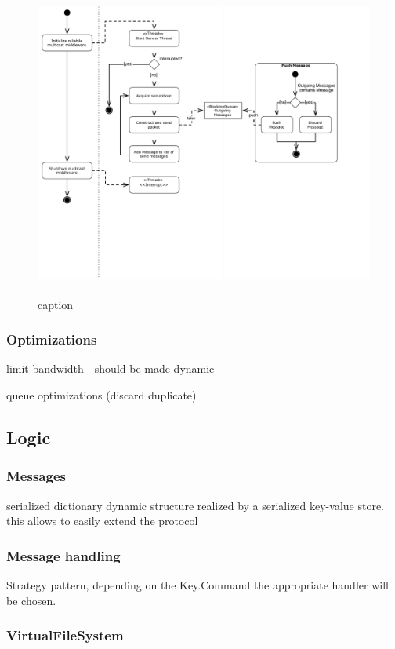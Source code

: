 \begin{figure}[htbp]
    \centering
        \includegraphics[height=4in]{figures/sendMessage.pdf}
    \caption{caption}
    \label{fig:figures_processMessages}
\end{figure}

\subsubsection{Optimizations}

limit bandwidth 
    - should be made dynamic
    
queue optimizations (discard duplicate)

\subsection{Logic}

    
    \subsubsection{Messages}
    serialized dictionary
    dynamic structure realized by a serialized key-value store. 
    this allows to easily extend the protocol


    \subsubsection{Message handling}
    Strategy pattern, depending on the Key.Command the appropriate handler will be chosen.
    
    \subsubsection{VirtualFileSystem}
    
